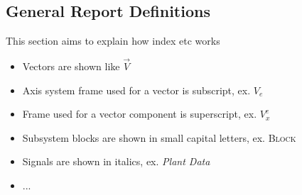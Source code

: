 \subsection{General Report Definitions}

This section aims to explain how index etc works

\begin{itemize}
\item Vectors are shown like $\vec V$
\item Axis system frame used for a vector is subscript, ex. \textbf{$V_e$}
\item Frame used for a vector component is superscript, ex. \textbf{$V^e_x$}
\item Subsystem blocks are shown in small capital letters, ex. \textsc{Block}
\item Signals are shown in italics, ex. \textit{Plant Data}
\item ...
\end{itemize}




